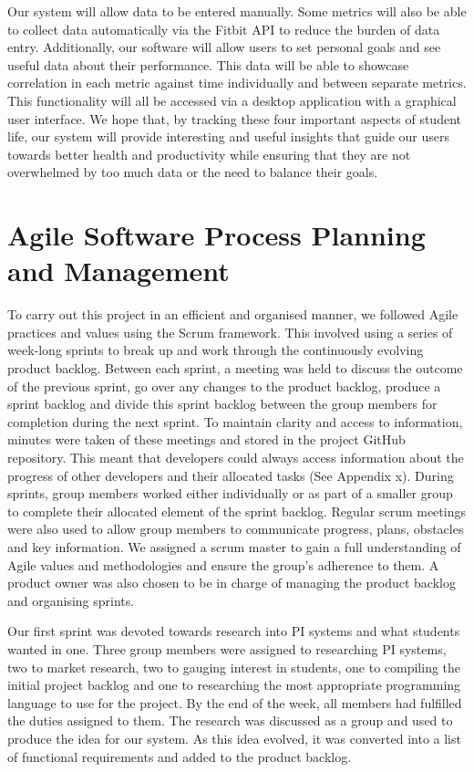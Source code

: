 \documentclass[12pt]{article}
\begin{document}
Our system will allow data to be entered manually. Some metrics will also be
able to collect data automatically via the Fitbit API to reduce the burden of
data entry. Additionally, our software will allow users to set personal goals
and see useful data about their performance. This data will be able to showcase
correlation in each metric against time individually and between separate
metrics. This functionality will all be accessed via a desktop application with
a graphical user interface. We hope that, by tracking these four important
aspects of student life, our system will provide interesting and useful
insights that guide our users towards better health and productivity while
ensuring that they are not overwhelmed by too much data or the need to balance
their goals.


\section{Agile Software Process Planning and Management}

To carry out this project in an efficient and organised manner, we followed
Agile practices and values using the Scrum framework. This involved using a
series of week-long sprints to break up and work through the continuously
evolving product backlog. Between each sprint, a meeting was held to discuss
the outcome of the previous sprint, go over any changes to the product backlog,
produce a sprint backlog and divide this sprint backlog between the group
members for completion during the next sprint. To maintain clarity and access
to information, minutes were taken of these meetings and stored in the project
GitHub repository. This meant that developers could always access information
about the progress of other developers and their allocated tasks (See Appendix
x). During sprints, group members worked either individually or as part of a
smaller group to complete their allocated element of the sprint backlog.
Regular scrum meetings were also used to allow group members to communicate
progress, plans, obstacles and key information. We assigned a scrum master to
gain a full understanding of Agile values and methodologies and ensure the
group's adherence to them. A product owner was also chosen to be in charge of
managing the product backlog and organising sprints.\par

Our first sprint was devoted towards research into PI systems and what students
wanted in one. Three group members were assigned to researching PI systems, two
to market research, two to gauging interest in students, one to compiling the
initial project backlog and one to researching the most appropriate programming
language to use for the project. By the end of the week, all members had
fulfilled the duties assigned to them. The research was discussed as a group
and used to produce the idea for our system. As this idea evolved, it was
converted into a list of functional requirements and added to the product
backlog.\par
\end{document}

